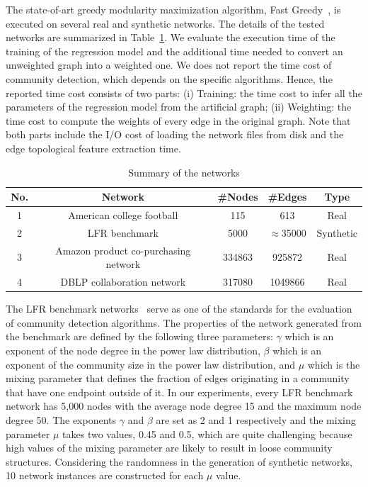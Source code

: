 The state-of-art greedy modularity maximization algorithm, Fast Greedy~\cite{clauset2004finding}, is executed on several real and synthetic networks. The details of the tested networks are summarized in Table~\ref{table:summary}.  We evaluate the execution time of the training of the regression model and the additional time needed to convert an unweighted graph into a weighted one. We does not report the time cost of community detection, which depends on the specific algorithms. Hence, the reported time cost consists of two parts: (i) Training: the time cost to infer all the parameters of the regression model from the artificial graph; (ii) Weighting: the time cost to compute the weights of every edge in the original graph. Note that both parts include the I/O cost of loading the network files from disk and the edge topological feature extraction time.
\begin{table}[!t]
\caption{Summary of the networks}
\label{table:summary}
\centering
\setlength\tabcolsep{2pt}
\begin{tabular}{ c|c|c|c|c }
 \hline
No. & Network & \#Nodes & \#Edges & Type\\
 \hline
1 & American college football & 115 & 613 & Real \\
2 & LFR benchmark & 5000 & $\approx$35000  & Synthetic\\
3 & Amazon product co-purchasing network & 334863 & 925872 & Real\\
4 & DBLP collaboration network & 317080 & 1049866 & Real \\
 \hline
\end{tabular}
\end{table}

The LFR benchmark networks~\cite{lancichinetti2008benchmark} serve as one of the standards for the evaluation of community detection algorithms. The properties of the network generated from the benchmark are defined by the following three parameters: $\gamma$ which is an exponent of the node degree in the power law distribution, $\beta$ which is an exponent of the community size in the power law distribution, and $\mu$ which is the mixing parameter that defines the fraction of edges originating in a community that have one endpoint outside of it. In our experiments, every LFR benchmark network has 5,000 nodes with the average node degree 15 and the maximum node degree 50. The exponents $\gamma$ and $\beta$ are set as 2 and 1 respectively and the mixing parameter $\mu$ takes two values, 0.45 and 0.5, which are quite challenging because high values of the mixing parameter are likely to result in loose community structures. Considering the randomness in the generation of synthetic networks, 10 network instances are constructed for each $\mu$ value.

